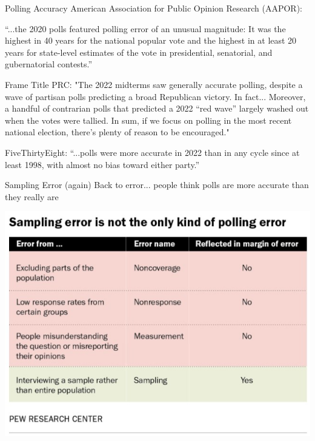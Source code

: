 \documentclass{beamer}
\begin{document}
\begin{frame}{Polling Accuracy}
American Association for Public Opinion Research (AAPOR):

“...the 2020 polls featured polling error of an unusual magnitude: It was the highest in 40 years for the national popular vote and the highest in at least 20 years for state-level estimates of the vote in presidential, senatorial, and gubernatorial contests.”
\end{frame}

\begin{frame}{Frame Title}
PRC: "The 2022 midterms saw generally accurate polling, despite a wave of partisan polls predicting a broad Republican victory. In fact... Moreover, a handful of contrarian polls that predicted a 2022 “red wave” largely washed out when the votes were tallied. In sum, if we focus on polling in the most recent national election, there’s plenty of reason to be encouraged." \vspace{6mm}

FiveThirtyEight: “...polls were more accurate in 2022 than in any cycle since at least 1998, with almost no bias toward either party.”
\end{frame}

\begin{frame}{Sampling Error (again)}
Back to error... people think polls are more accurate than they really are
\begin{center}
\includegraphics[scale=.8]{img/sampling_error_chart.jpg}
\end{center}
\end{frame}
\end{document}
